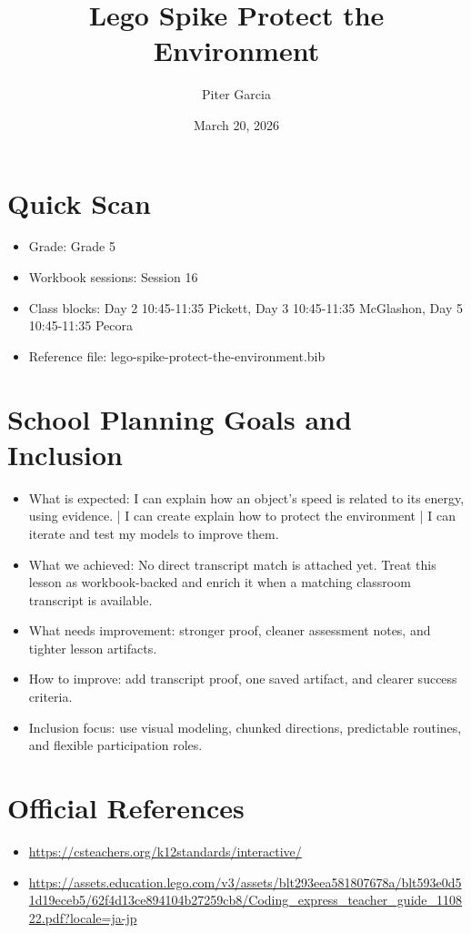 \documentclass[11pt]{article}
\title{Lego Spike Protect the Environment}
\author{Piter Garcia}
\date{March 20, 2026}
\begin{document}
    \maketitle
    \section*{Quick Scan}
    \begin{itemize}[leftmargin=*]
    \item Grade: Grade 5
    \item Workbook sessions: Session 16
    \item Class blocks: Day 2 10:45-11:35 Pickett, Day 3 10:45-11:35 McGlashon, Day 5 10:45-11:35 Pecora
    \item Reference file: lego-spike-protect-the-environment.bib
    \end{itemize}
    \section*{School Planning Goals and Inclusion}
    \begin{itemize}[leftmargin=*]
    \item What is expected: I can explain how an object's speed is related to its energy, using evidence. | I can create explain how to protect the environment | I can iterate and test my models to improve them.
    \item What we achieved: No direct transcript match is attached yet. Treat this lesson as workbook-backed and enrich it when a matching classroom transcript is available.
    \item What needs improvement: stronger proof, cleaner assessment notes, and tighter lesson artifacts.
    \item How to improve: add transcript proof, one saved artifact, and clearer success criteria.
    \item Inclusion focus: use visual modeling, chunked directions, predictable routines, and flexible participation roles.
    \end{itemize}
    \section*{Official References}
    \begin{itemize}[leftmargin=*]
    \item \url{https://csteachers.org/k12standards/interactive/}
\item \url{https://assets.education.lego.com/v3/assets/blt293eea581807678a/blt593e0d51d19eceb5/62f4d13ce894104b27259cb8/Coding_express_teacher_guide_110822.pdf?locale=ja-jp}

    \end{itemize}
    
\end{document}
